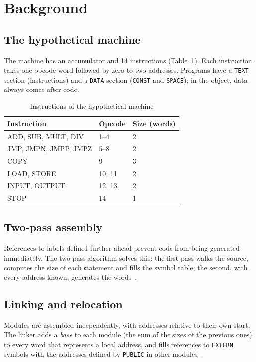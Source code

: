 \documentclass[conference]{IEEEtran}
\begin{document}
\section{Background}
\subsection{The hypothetical machine}
The machine has an accumulator and 14 instructions (Table~\ref{tab:isa}). Each instruction takes one opcode word followed by zero to two addresses. Programs have a \texttt{TEXT} section (instructions) and a \texttt{DATA} section (\texttt{CONST} and \texttt{SPACE}); in the object, data always comes after code.

\begin{table}[!htbp]
\centering
\caption{Instructions of the hypothetical machine}\label{tab:isa}
\begin{tabular}{p{2.5cm} p{1.2cm} p{3.3cm}}
\toprule
\textbf{Instruction} & \textbf{Opcode} & \textbf{Size (words)}\\
\midrule
ADD, SUB, MULT, DIV & 1--4 & 2\\
JMP, JMPN, JMPP, JMPZ & 5--8 & 2\\
COPY & 9 & 3\\
LOAD, STORE & 10, 11 & 2\\
INPUT, OUTPUT & 12, 13 & 2\\
STOP & 14 & 1\\
\bottomrule
\end{tabular}
\end{table}

\subsection{Two-pass assembly}
References to labels defined further ahead prevent code from being generated immediately. The two-pass algorithm solves this: the first pass walks the source, computes the size of each statement and fills the symbol table; the second, with every address known, generates the words~\cite{beck}.

\subsection{Linking and relocation}
Modules are assembled independently, with addresses relative to their own start. The linker adds a \emph{base} to each module (the sum of the sizes of the previous ones) to every word that represents a local address, and fills references to \texttt{EXTERN} symbols with the addresses defined by \texttt{PUBLIC} in other modules~\cite{levine}.
\end{document}
